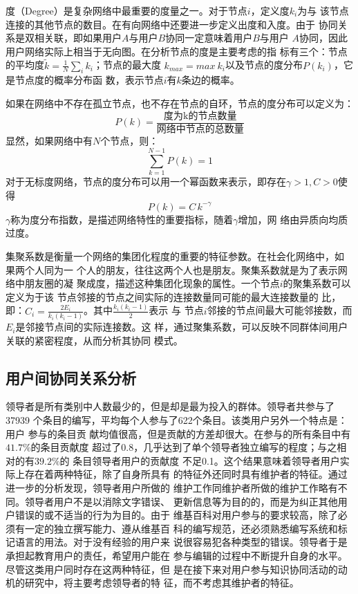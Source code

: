 度（Degree）是复杂网络中最重要的度量之一。对于节点$i$，定义度$k_i$为与
该节点连接的其他节点的数目。在有向网络中还要进一步定义出度和入度。由于
协同关系是双相关联，即如果用户$A$与用户$B$协同一定意味着用户$B$与用户
$A$协同，因此用户网络实际上相当于无向图。在分析节点的度是主要考虑的指
标有三个：节点的平均度$\tilde{ k}=\frac{1}{N}\sum_i k_i$；节点的最大度
$k_{max}=max \  k_i$以及节点的度分布$P(k_i)$，它是节点度的概率分布函
数，表示节点$i$有$k$条边的概率。

如果在网络中不存在孤立节点，也不存在节点的自环，节点的度分布可以定义为：
\[
P(k)=\frac{\text{度为k的节点数量}}{\text{网络中节点的总数量}}
\]
显然，如果网络中有$N$个节点，则：
\[
\sum_{k=1}^{N-1}P(k)=1
\]
对于无标度网络，节点的度分布可以用一个幂函数来表示，即存在$\gamma>1,
C>0$使得
\[
P(k)= C \, k^{- \gamma}
\]
$\gamma$称为度分布指数，是描述网络特性的重要指标，随着$\gamma$增加，网
络由异质向均质过度。

集聚系数是衡量一个网络的集团化程度的重要的特征参数。在社会化网络中，如
果两个人同为一
个人的朋友，往往这两个人也是朋友。聚集系数就是为了表示网络中朋友圈的凝
聚成度，描述这种集团化现象的属性。一个节点$i$的聚集系数可以定义为于该
节点邻接的节点之间实际的连接数量同可能的最大连接数量的
比，即：$C_i=\frac{2E_i}{k_i(k_i-1)}$。其中$\frac{k_i(k_i-1)}{2}$表示
与
节点$i$邻接的节点间最大可能邻接数，而$E_i$是邻接节点间的实际连接数。这
样，通过聚集系数，可以反映不同群体间用户关联的紧密程度，从而分析其协同
模式。

\subsection{用户间协同关系分析}


领导者是所有类别中人数最少的，但是却是最为投入的群体。领导者共参与了37939
个条目的编写，平均每个人参与了622个条目。该类用户另外一个特点是：用户
参与的条目贡
献均值很高，但是贡献的方差却很大。在参与的所有条目中有$41.7\%$的条目贡献度
超过了0.8，几乎达到了单个领导者独立编写的程度；与之相对的有$39.2\%$的
条目领导者用户的贡献度
不足0.1。这个结果意味着领导者用户实际上存在着两种特征，除了自身所具有
的特征外还同时具有维护者的特征。通过进一步的分析发现，领导者用户所做的
维护工作同维护者所做的维护工作略有不同。领导者用户不是以消除文字错误、
更新信息等为目的的，而是为纠正其他用户错误的或不适当的行为为目的。由于
维基百科对用户参与的要求较高，除了必须有一定的独立撰写能力、遵从维基百
科的编写规范，还必须熟悉编写系统和标记语言的用法。对于没有经验的用户来
说很容易犯各种类型的错误。领导者于是承担起教育用户的责任，希望用户能在
参与编辑的过程中不断提升自身的水平。尽管这类用户同时存在这两种特征，但
是在接下来对用户参与知识协同活动的动机的研究中，将主要考虑领导者的特
征，而不考虑其维护者的特征。

